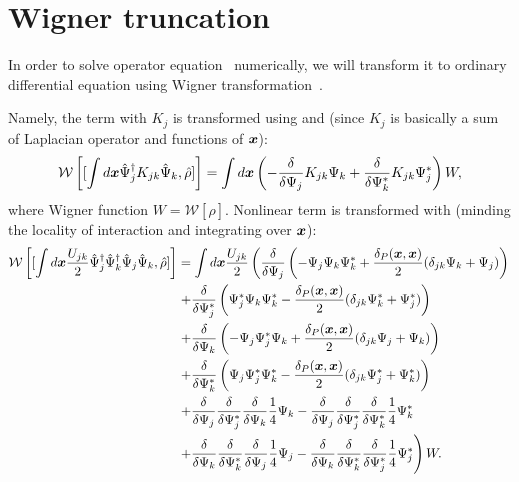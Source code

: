 \section{Wigner truncation}

In order to solve operator equation~ numerically,
we will transform it to ordinary differential equation using Wigner transformation~.

Namely, the term with $K_j$ is transformed using  and 
(since $K_j$ is basically a sum of Laplacian operator and functions of $\boldsymbol{x}$):
\[
	\mathcal{W} \left[ [ \int d\boldsymbol{x} \hat{\Psi}_j^\dagger K_{jk} \hat{\Psi}_k, \hat{\rho} ] \right]
	= \int d\boldsymbol{x} \left(
			- \frac{\delta}{\delta \Psi_j} K_{jk} \Psi_k
			+ \frac{\delta}{\delta \Psi_k^*} K_{jk} \Psi_j^*
		\right)
		W,
\]
where Wigner function $W = \mathcal{W}[\hat{\rho}]$.
Nonlinear term is transformed with 
(minding the locality of interaction and integrating over $\boldsymbol{x}$):
\begin{equation*}
\begin{split}
	\mathcal{W} \left[
		[
			\int d\boldsymbol{x} \frac{U_{jk}}{2}
				\hat{\Psi}_j^\dagger \hat{\Psi}_k^\dagger \hat{\Psi}_j \hat{\Psi}_k,
			\hat{\rho}
		]
	\right]
	& = \int d\boldsymbol{x} \frac{U_{jk}}{2} \left(
		\frac{\delta}{\delta \Psi_j} \left(
			- \Psi_j \Psi_k \Psi_k^*
			+ \frac{\delta_P(\boldsymbol{x}, \boldsymbol{x})}{2} ( \delta_{jk} \Psi_k + \Psi_j )
		\right) \right. \\
	&	\left. + \frac{\delta}{\delta \Psi_j^*} \left(
			\Psi_j^* \Psi_k \Psi_k^*
			- \frac{\delta_P(\boldsymbol{x}, \boldsymbol{x})}{2} ( \delta_{jk} \Psi_k^* + \Psi_j^* )
		\right) \right. \\
	&	\left. + \frac{\delta}{\delta \Psi_k} \left(
			- \Psi_j \Psi_j^* \Psi_k
			+ \frac{\delta_P(\boldsymbol{x}, \boldsymbol{x})}{2} ( \delta_{jk} \Psi_j + \Psi_k )
		\right) \right. \\
	&	\left. + \frac{\delta}{\delta \Psi_k^*} \left(
			\Psi_j \Psi_j^* \Psi_k^*
			- \frac{\delta_P(\boldsymbol{x}, \boldsymbol{x})}{2} ( \delta_{jk} \Psi_j^* + \Psi_k^* )
		\right) \right. \\
	&	\left.
			+ \frac{\delta}{\delta \Psi_j}
			\frac{\delta}{\delta \Psi_j^*}
			\frac{\delta}{\delta \Psi_k}
			\frac{1}{4} \Psi_k
			- \frac{\delta}{\delta \Psi_j}
			\frac{\delta}{\delta \Psi_j^*}
			\frac{\delta}{\delta \Psi_k^*}
			\frac{1}{4} \Psi_k^*
		\right. \\
	&	\left.
			+ \frac{\delta}{\delta \Psi_k}
			\frac{\delta}{\delta \Psi_k^*}
			\frac{\delta}{\delta \Psi_j}
			\frac{1}{4} \Psi_j
			- \frac{\delta}{\delta \Psi_k}
			\frac{\delta}{\delta \Psi_k^*}
			\frac{\delta}{\delta \Psi_j^*}
			\frac{1}{4} \Psi_j^*
		\right) W.
\end{split}
\end{equation*}
